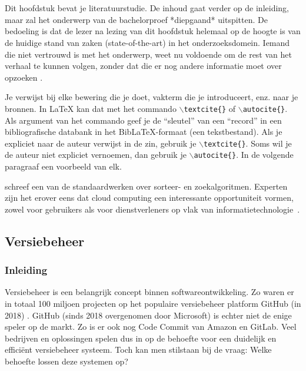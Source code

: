 \chapter{}
\label{ch:stand-van-zaken}
\graphicspath{{../../Images/}} 


Dit hoofdstuk bevat je literatuurstudie. De inhoud gaat verder op de inleiding, maar zal het onderwerp van de bachelorproef *diepgaand* uitspitten. De bedoeling is dat de lezer na lezing van dit hoofdstuk helemaal op de hoogte is van de huidige stand van zaken (state-of-the-art) in het onderzoeksdomein. Iemand die niet vertrouwd is met het onderwerp, weet nu voldoende om de rest van het verhaal te kunnen volgen, zonder dat die er nog andere informatie moet over opzoeken \autocite{Pollefliet2011}.

Je verwijst bij elke bewering die je doet, vakterm die je introduceert, enz. naar je bronnen. In \LaTeX{} kan dat met het commando \texttt{$\backslash${textcite\{\}}} of \texttt{$\backslash${autocite\{\}}}. Als argument van het commando geef je de ``sleutel'' van een ``record'' in een bibliografische databank in het Bib\LaTeX{}-formaat (een tekstbestand). Als je expliciet naar de auteur verwijst in de zin, gebruik je \texttt{$\backslash${}textcite\{\}}.
Soms wil je de auteur niet expliciet vernoemen, dan gebruik je \texttt{$\backslash${}autocite\{\}}. In de volgende paragraaf een voorbeeld van elk.

\textcite{Knuth1998} schreef een van de standaardwerken over sorteer- en zoekalgoritmen. Experten zijn het erover eens dat cloud computing een interessante opportuniteit vormen, zowel voor gebruikers als voor dienstverleners op vlak van informatietechnologie~\autocite{Creeger2009}.
\newpage
\section{Versiebeheer}
\subsection{Inleiding}
\label{sec:vb_inleiding}
Versiebeheer is een belangrijk concept binnen softwareontwikkeling. Zo waren er in totaal 100 miljoen projecten op het populaire versiebeheer platform GitHub (in 2018) \autocite{Git2018}. GitHub (sinds 2018 overgenomen door Microsoft) is echter niet de enige speler op de markt. Zo is er ook nog Code Commit van Amazon en GitLab. Veel bedrijven en oplossingen spelen dus in op de behoefte voor een duidelijk en efficiënt versiebeheer systeem. Toch kan men stilstaan bij de vraag: Welke behoefte lossen deze systemen op?

